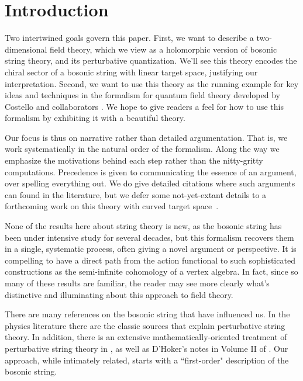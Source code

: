 
\section{Introduction}

Two intertwined goals govern this paper.
First, we want to describe a two-dimensional field theory,
which we view as a holomorphic version of bosonic string theory,
and its perturbative quantization.
We'll see this theory encodes the chiral sector of a bosonic string with linear target space,
justifying our interpretation.
Second, we want to use this theory as the running example for key ideas and techniques in the formalism for quantum field theory developed by Costello and collaborators \cite{CosBook, CG1,CG2, LL1, GG1, GLL, LiVA}.
We hope to give readers a feel for how to use this formalism by exhibiting it with a beautiful theory.

Our focus is thus on narrative rather than detailed argumentation.
That is, we work systematically in the natural order of the formalism. 
Along the way we emphasize the motivations behind each step rather than the nitty-gritty computations. 
Precedence is given to communicating the essence of an argument, over spelling everything out.
We do give detailed citations where such arguments can found in the literature,
but we defer some not-yet-extant details to a forthcoming work on this theory with curved target space~\cite{GWcurved}.

None of the results here about string theory is new, 
as the bosonic string has been under intensive study for several decades,
but this formalism recovers them in a single, systematic process,
often giving a novel argument or perspective.
It is compelling to have a direct path from the action functional to such sophisticated constructions as the semi-infinite cohomology of a vertex algebra.
In fact, since so many of these results are familiar,
the reader may see more clearly what's distinctive and illuminating about this approach to field theory.

There are many references on the bosonic string that have influenced us.
In the physics literature there are the classic sources \cite{GSW1, GSW2, polchinski} that explain perturbative string theory. 
In addition, there is an extensive mathematically-oriented treatment of perturbative string theory in \cite{DP}, as well as D'Hoker's notes in Volume II of \cite{IAScourse}.
Our approach, while intimately related, starts with a ``first-order" description of the bosonic string. 

